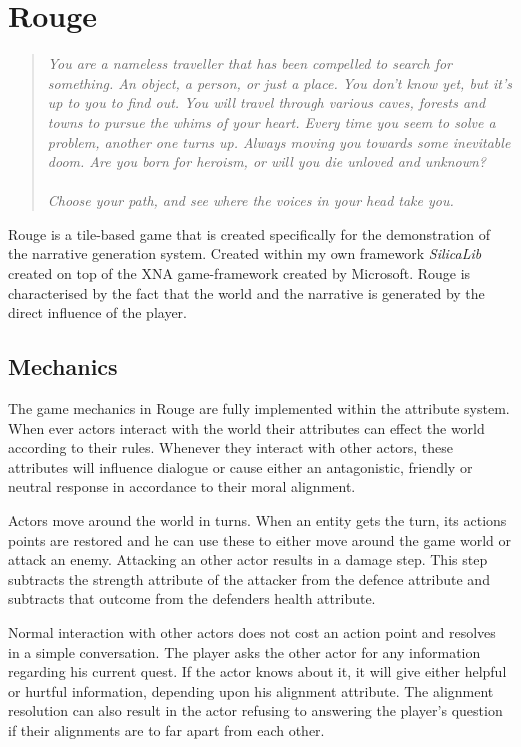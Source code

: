 \chapter{Rouge}
\label{ch:rouge}
\begin{quotation}
\textsl{You are a nameless traveller that has been compelled to search for something.
An object, a person, or just a place.
You don't know yet, but it's up to you to find out.
You will travel through various caves, forests and towns to pursue the whims of your heart.
Every time you seem to solve a problem, another one turns up.
Always moving you towards some inevitable doom.
Are you born for heroism, or will you die unloved and unknown? \\\\Choose your path, and see where the voices in your head take you.}
\end{quotation}
Rouge is a \rogue tile-based game that is created specifically for the demonstration of the \diage narrative generation system.
Created within my own framework \textit{SilicaLib} created on top of the XNA game-framework created by Microsoft.
Rouge is characterised by the fact that the world and the narrative is generated by the direct influence of the player.

\section{Mechanics}
The game mechanics in Rouge are fully implemented within the \diage attribute system.
When ever actors interact with the world their attributes can effect the world according to their rules.
Whenever they interact with other actors, these attributes will influence dialogue or cause either an antagonistic, friendly or neutral response in accordance to their moral alignment.

Actors move around the world in turns.
When an entity gets the turn, its actions points are restored and he can use these to either move around the game world or attack an enemy.
Attacking an other actor results in a damage step.
This step subtracts the strength attribute of the attacker from the defence attribute and subtracts that outcome from the defenders health attribute.


Normal interaction with other actors does not cost an action point and resolves in a simple conversation.
The player asks the other actor for any information regarding his current quest.
If the actor knows about it, it will give either helpful or hurtful information, depending upon his alignment attribute.
The alignment resolution can also result in the actor refusing to answering the player's question if their alignments are to far apart from each other.

